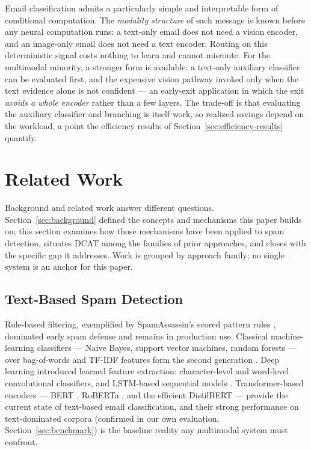 \documentclass[10pt,twoside]{article}
\begin{document}
Email classification admits a particularly simple and interpretable form of conditional computation. The \emph{modality structure} of each message is known before any neural computation runs: a text-only email does not need a vision encoder, and an image-only email does not need a text encoder. Routing on this deterministic signal costs nothing to learn and cannot misroute. For the multimodal minority, a stronger form is available: a text-only auxiliary classifier can be evaluated first, and the expensive vision pathway invoked only when the text evidence alone is not confident --- an early-exit application in which the exit \emph{avoids a whole encoder} rather than a few layers. The trade-off is that evaluating the auxiliary classifier and branching is itself work, so realized savings depend on the workload, a point the efficiency results of Section~\ref{sec:efficiency-results} quantify.

\section{Related Work}\label{sec:related}

Background and related work answer different questions. Section~\ref{sec:background} defined the concepts and mechanisms this paper builds on; this section examines how those mechanisms have been applied to spam detection, situates DCAT among the families of prior approaches, and closes with the specific gap it addresses. Work is grouped by approach family; no single system is an anchor for this paper.

\subsection{Text-Based Spam Detection}\label{sec:rw-text}

Rule-based filtering, exemplified by SpamAssassin's scored pattern rules \citep{spamassassin2006}, dominated early spam defense and remains in production use. Classical machine-learning classifiers --- Naive Bayes, support vector machines, random forests --- over bag-of-words and TF-IDF features form the second generation \citep{janez2023review}. Deep learning introduced learned feature extraction: character-level \citep{zhang2015charcnn} and word-level \citep{kim2014cnn} convolutional classifiers, and LSTM-based sequential models \citep{hochreiter1997lstm}. Transformer-based encoders --- BERT \citep{devlin2019bert}, RoBERTa \citep{liu2019roberta}, and the efficient DistilBERT \citep{sanh2019distilbert} --- provide the current state of text-based email classification, and their strong performance on text-dominated corpora (confirmed in our own evaluation, Section~\ref{sec:benchmark}) is the baseline reality any multimodal system must confront.
\end{document}
